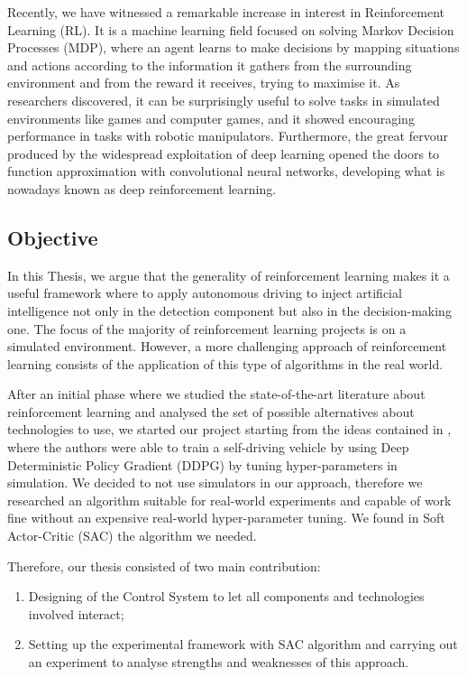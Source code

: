 \documentclass[10pt,twocolumn,letterpaper]{article}
\begin{document}
Recently, we have witnessed a remarkable increase in interest in Reinforcement Learning (RL). It is a machine learning field focused on solving Markov Decision Processes (MDP), where an agent learns to make decisions by mapping situations and actions according to the information it gathers from the surrounding environment and from the reward it receives, trying to maximise it.
As researchers discovered, it can be surprisingly useful to solve tasks in simulated environments like games and computer games, and it showed encouraging performance in tasks with robotic manipulators. Furthermore, the great fervour produced by the widespread exploitation of deep learning opened the doors to function approximation with convolutional neural networks, developing what is nowadays known as deep reinforcement learning.

\subsection{Objective}

In this Thesis, we argue that the generality of reinforcement learning makes it a useful framework where to apply autonomous driving to inject artificial intelligence not only in the detection component but also in the decision-making one.
The focus of the majority of reinforcement learning projects is on a simulated environment. However, a more challenging approach of reinforcement learning consists of the application of this type of algorithms in the real world.

After an initial phase where we studied the state-of-the-art literature about reinforcement learning and analysed the set of possible alternatives about technologies to use, we started our project starting from the ideas contained in \cite{kendall2019learning}, where the authors were able to train a self-driving vehicle by using Deep Deterministic Policy Gradient (DDPG) \cite{lillicrap2015continuous} by tuning hyper-parameters in simulation. We decided to not use simulators in our approach, therefore we researched an algorithm suitable for real-world experiments and capable of work fine without an expensive real-world hyper-parameter tuning. We found in Soft Actor-Critic (SAC) \cite{haarnoja2018soft} the algorithm we needed.

Therefore, our thesis consisted of two main contribution:
\begin{enumerate}
    \item Designing of the Control System to let all components and technologies involved interact;
    \item Setting up the experimental framework with SAC algorithm and carrying out an experiment to analyse strengths and weaknesses of this approach.
\end{enumerate}
\end{document}
